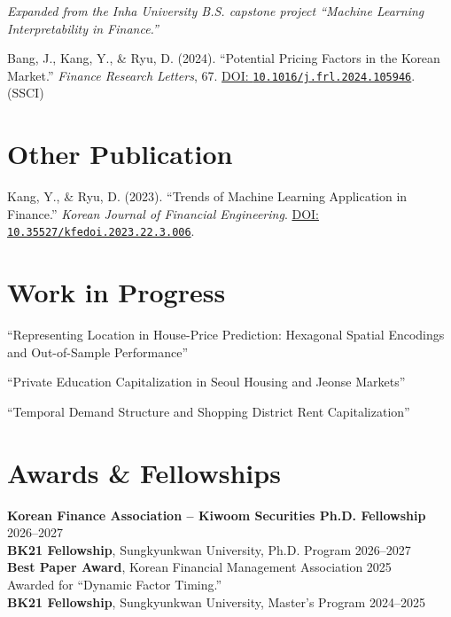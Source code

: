 \documentclass[11pt,a4paper]{article}
\begin{document}
\begin{description}[leftmargin=2.2em]
{\normalfont\small\itshape Expanded from the Inha University B.S. capstone project ``Machine Learning Interpretability in Finance.''}
\item[\normalfont{[1]}] Bang, J., Kang, Y., \& Ryu, D. (2024). ``Potential Pricing Factors in the Korean Market.'' \textit{Finance Research Letters}, 67. \href{https://doi.org/10.1016/j.frl.2024.105946}{DOI: \nolinkurl{10.1016/j.frl.2024.105946}}. (SSCI)
\end{description}

\section{Other Publication}

\begin{description}[leftmargin=2.2em]
\item[\normalfont{[1]}] Kang, Y., \& Ryu, D. (2023). ``Trends of Machine Learning Application in Finance.'' \textit{Korean Journal of Financial Engineering}. \href{https://doi.org/10.35527/kfedoi.2023.22.3.006}{DOI: \nolinkurl{10.35527/kfedoi.2023.22.3.006}}.
\end{description}

\newpage
\section{Work in Progress}

\begin{enumerate}[label={[\arabic*]},leftmargin=2.2em]
\item ``Representing Location in House-Price Prediction: Hexagonal Spatial Encodings and Out-of-Sample Performance''
\item ``Private Education Capitalization in Seoul Housing and Jeonse Markets''
\item ``Temporal Demand Structure and Shopping District Rent Capitalization''
\end{enumerate}

\section{Awards \& Fellowships}

\textbf{Korean Finance Association -- Kiwoom Securities Ph.D. Fellowship} \hfill 2026--2027\\
\textbf{BK21 Fellowship}, Sungkyunkwan University, Ph.D. Program \hfill 2026--2027\\
\textbf{Best Paper Award}, Korean Financial Management Association \hfill 2025\\
{\small Awarded for ``Dynamic Factor Timing.''}\\
\textbf{BK21 Fellowship}, Sungkyunkwan University, Master's Program \hfill 2024--2025
\end{document}
